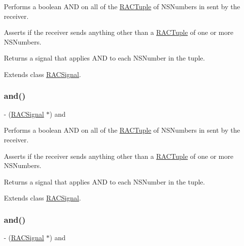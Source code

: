 Performs a boolean A\+ND on all of the \mbox{\hyperlink{interface_r_a_c_tuple}{R\+A\+C\+Tuple}} of N\+S\+Numbers in sent by the receiver.

Asserts if the receiver sends anything other than a \mbox{\hyperlink{interface_r_a_c_tuple}{R\+A\+C\+Tuple}} of one or more N\+S\+Numbers.

Returns a signal that applies A\+ND to each N\+S\+Number in the tuple. 

Extends class \mbox{\hyperlink{interface_r_a_c_signal_a4a12f1ef58487260894d1ef37dbb9c9d}{R\+A\+C\+Signal}}.

\mbox{\label{category_r_a_c_signal_07_operations_08_a4a12f1ef58487260894d1ef37dbb9c9d}} 
\subsubsection{\texorpdfstring{and()}{and()}\hspace{0.1cm}{\footnotesize\ttfamily [2/3]}}
{\footnotesize\ttfamily -\/ (\mbox{\hyperlink{interface_r_a_c_signal}{R\+A\+C\+Signal}} $\ast$) and \begin{DoxyParamCaption}{ }\end{DoxyParamCaption}}

Performs a boolean A\+ND on all of the \mbox{\hyperlink{interface_r_a_c_tuple}{R\+A\+C\+Tuple}} of N\+S\+Numbers in sent by the receiver.

Asserts if the receiver sends anything other than a \mbox{\hyperlink{interface_r_a_c_tuple}{R\+A\+C\+Tuple}} of one or more N\+S\+Numbers.

Returns a signal that applies A\+ND to each N\+S\+Number in the tuple. 

Extends class \mbox{\hyperlink{interface_r_a_c_signal_a4a12f1ef58487260894d1ef37dbb9c9d}{R\+A\+C\+Signal}}.

\mbox{\label{category_r_a_c_signal_07_operations_08_a4a12f1ef58487260894d1ef37dbb9c9d}} 
\subsubsection{\texorpdfstring{and()}{and()}\hspace{0.1cm}{\footnotesize\ttfamily [3/3]}}
{\footnotesize\ttfamily -\/ (\mbox{\hyperlink{interface_r_a_c_signal}{R\+A\+C\+Signal}} $\ast$) and \begin{DoxyParamCaption}{ }\end{DoxyParamCaption}}

